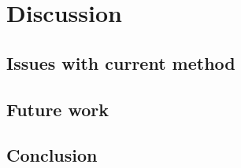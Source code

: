 
\chapter{Discussion} \label{sec:discussion}

\section{Issues with current method}

\section{Future work}

\section{Conclusion}


